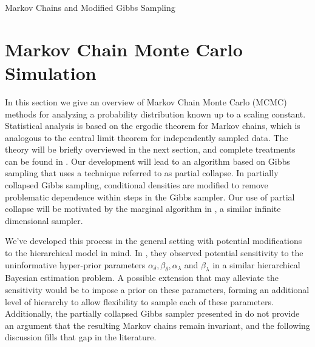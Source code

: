 \begin{chapter}{Markov Chains and Modified Gibbs Sampling}
\section{Markov Chain Monte Carlo Simulation} \label{sec:mcmcTheory}
In this section we give an overview of Markov Chain Monte Carlo (MCMC) methods for analyzing a probability distribution known up to a scaling constant.
Statistical analysis is based on the ergodic theorem for Markov chains, which is analogous to the central limit theorem for independently sampled data. 
The theory will be briefly overviewed in the next section, and complete treatments can be found in \citep{robert2013monte}.
Our development will lead to an algorithm based on Gibbs sampling that uses a technique referred to as partial collapse.  
In partially collapsed Gibbs sampling, conditional densities are modified to remove problematic dependence within steps in the Gibbs sampler.
Our use of partial collapse will be motivated by the marginal algorithm in \citep{agapiou2014analysis}, a similar infinite dimensional sampler.

We've developed this process in the general setting with potential modifications to the hierarchical model in mind.
In \citep{howard2016bayesian}, they observed potential sensitivity to the uninformative hyper-prior parameters $\alpha_\delta,\beta_\delta,\alpha_\lambda$ and $\beta_\lambda$ in a similar hierarchical Bayesian estimation problem.
A possible extension that may alleviate the sensitivity would be to impose a prior on these parameters, forming an additional level of hierarchy to allow flexibility to sample each of these parameters.
Additionally, the partially collapsed Gibbs sampler presented in \citep{van2015metropolis,van2008partially} do not provide an argument that the resulting Markov chains remain invariant, and the following discussion fills that gap in the literature.


\end{chapter}
